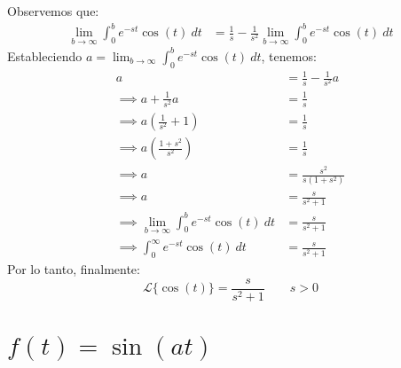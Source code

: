 \documentclass[12pt, a4paper]{article}
\begin{document}
Observemos que:
\begin{align*}
	\lim_{b \to \infty} \int_{0}^{b} e^{-st} \cos (t) \ dt &= \frac{1}{s} - \frac{1}{s^{2}}\lim_{b \to \infty} \int_{0}^{b} e^{-st} \cos (t) \ dt
\end{align*}
Estableciendo \(a = \lim_{b \to \infty} \int_{0}^{b} e^{-st} \cos (t) \ dt\), tenemos:
\begin{align*}
	a &= \frac{1}{s} - \frac{1}{s ^{2}} a \\
	\implies a + \frac{1}{s ^{2}} a &= \frac{1}{s} \\
	\implies a \left(\frac{1}{s ^{2}} + 1 \right) &= \frac{1}{s} \\
	\implies a \left( \frac{1+s ^{2}}{s ^{2}} \right) &= \frac{1}{s} \\
	\implies a &= \frac{s ^{2}}{s(1+s ^{2})} \\
	\implies a &= \frac{s}{s ^{2} + 1} \\
	\implies \lim_{b \to \infty} \int_{0}^{b} e^{-st} \cos (t) \ dt &= \frac{s}{s ^{2} + 1} \\
	\implies \int_{0}^{\infty} e^{-st} \cos (t) \ dt &= \frac{s}{s ^{2} + 1}
\end{align*}
Por lo tanto, finalmente:
\[
	\mathcal{L}\{\cos (t)\} = \frac{s}{s ^{2} + 1} \qquad s > 0
\]

\section{\texorpdfstring{\(f(t)=\sin(at)\)}{f (t) = sin (at)}}
\end{document}

